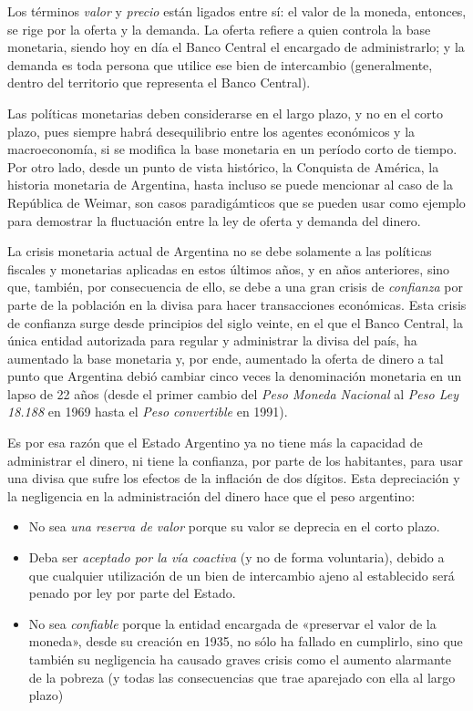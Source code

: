 \documentclass[12pt,a4paper,twoside]{book}
\begin{document}
Los términos \textit{valor} y \textit{precio} están ligados entre sí: el valor de la moneda, entonces, se rige por la oferta y la demanda. La oferta refiere a quien controla la base monetaria, siendo hoy en día el Banco Central el encargado de administrarlo; y la demanda es toda persona que utilice ese bien de intercambio (generalmente, dentro del territorio que representa el Banco Central).

Las políticas monetarias deben considerarse en el largo plazo, y no en el corto plazo, pues siempre habrá desequilibrio entre los agentes económicos y la macroeconomía, si se modifica la base monetaria en un período corto de tiempo. Por otro lado, desde un punto de vista histórico, la Conquista de América, la historia monetaria de Argentina, hasta incluso se puede mencionar al caso de la República de Weimar, son casos paradigámticos que se pueden usar como ejemplo para demostrar la fluctuación entre la ley de oferta y demanda del dinero.

La crisis monetaria actual de Argentina no se debe solamente a las políticas fiscales y monetarias aplicadas en estos últimos años, y en años anteriores, sino que, también, por consecuencia de ello, se debe a una gran crisis de \textit{confianza} por parte de la población en la divisa para hacer transacciones económicas. Esta crisis de confianza surge desde principios del siglo veinte, en el que el Banco Central, la única entidad autorizada para regular y administrar la divisa del país, ha aumentado la base monetaria y, por ende, aumentado la oferta de dinero a tal punto que Argentina debió cambiar cinco veces la denominación monetaria en un lapso de 22 años (desde el primer cambio del \textit{Peso Moneda Nacional} al \textit{Peso Ley 18.188} en 1969 hasta el \textit{Peso convertible} en 1991).

Es por esa razón que el Estado Argentino ya no tiene más la capacidad de administrar el dinero, ni tiene la confianza, por parte de los habitantes, para usar una divisa que sufre los efectos de la inflación de dos dígitos. Esta depreciación y la negligencia en la administración del dinero hace que el peso argentino:

\begin{itemize}
\item No sea \textit{una reserva de valor} porque su valor se deprecia en el corto plazo.
\item Deba ser \textit{aceptado por la vía coactiva} (y no de forma voluntaria), debido a que cualquier utilización de un bien de intercambio ajeno al establecido será penado por ley por parte del Estado.
\item No sea \textit{confiable} porque la entidad encargada de «preservar el valor de la moneda», desde su creación en 1935, no sólo ha fallado en cumplirlo, sino que también su negligencia ha causado graves crisis como el aumento alarmante de la pobreza (y todas las consecuencias que trae aparejado con ella al largo plazo)
\end{itemize}
\end{document}
